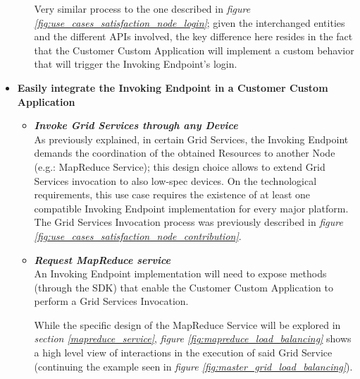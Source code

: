 \begin{itemize}
\begin{itemize}
        Very similar process to the one described in \textit{figure \ref{fig:use_cases_satisfaction_node_login}}; given the interchanged entities and the different APIs involved, the key difference here resides in the fact that the Customer Custom Application will implement a custom behavior that will trigger the Invoking Endpoint's login. 
    \end{itemize}
    \item \textbf{Easily integrate the Invoking Endpoint in a Customer Custom Application}\\
    \begin{itemize}
        \item \textbf{\textit{Invoke Grid Services through any Device}}\\
        As previously explained, in certain Grid Services, the Invoking Endpoint demands the coordination of the obtained Resources to another Node (e.g.: MapReduce Service); this design choice allows to extend Grid Services invocation to also low-spec devices. On the technological requirements, this use case requires the existence of at least one compatible Invoking Endpoint implementation for every major platform.
        The Grid Services Invocation process was previously described in \textit{figure \ref{fig:use_cases_satisfaction_node_contribution}}.

        \item \textbf{\textit{Request MapReduce service}}\\
        An Invoking Endpoint implementation will need to expose methods (through the SDK) that enable the Customer Custom Application to perform a Grid Services Invocation.

        While the specific design of the MapReduce Service will be explored in \textit{section \ref{mapreduce_service}}, \textit{figure \ref{fig:mapreduce_load_balancing}} shows a high level view of interactions in the execution of said Grid Service (continuing the example seen in \textit{figure \ref{fig:master_grid_load_balancing}}).


\end{itemize}
\end{itemize}
